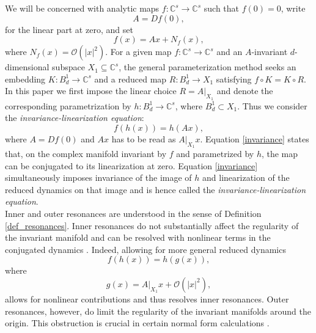 \documentclass{amsart}
\theoremstyle{plain}
\theoremstyle{definition}
\begin{document}
We will be concerned with analytic maps $f:\mathbb{C}^s\to\mathbb{C}^s$ such that $f(0)=0$, write
\begin{equation}\label{defA}
A=Df(0),
\end{equation}
for the linear part at zero, and set
\begin{equation}
f(x)=Ax+N_f(x),
\end{equation}
where $N_f(x)=\mathcal{O}(|x|^2)$. For a given map $f:\mathbb{C}^s\to\mathbb{C}^s$ and an $A$-invariant $d$-dimensional subspace $X_1\subseteq\mathbb{C}^s$, the general parameterization method seeks an embedding $K:B^1_d\to\mathbb{C}^s$ and a reduced map $R:B^1_d\to X_1$ satisfying $f\circ K=K\circ R$. In this paper we first impose the linear choice $R=A|_{X_1}$ and denote the corresponding parametrization by $h:B^1_d\to\mathbb{C}^s$, where $B^1_d\subset X_1$. Thus we consider the \emph{invariance-linearization equation}:
\begin{equation}\label{invariance}
f(h(x))=h(Ax),
\end{equation}
where $A=Df(0)$ and $Ax$ has to be read as $A|_{X_1}x$. Equation \eqref{invariance} states that, on the complex manifold invariant by $f$ and parametrized by $h$, the map can be conjugated to its linearization at zero. Equation \eqref{invariance} simultaneously imposes invariance of the image of $h$ and linearization of the reduced dynamics on that image and is hence called the \emph{invariance-linearization equation}.\\
Inner and outer resonances are understood in the sense of Definition \ref{def_resonances}. Inner resonances do not substantially affect the regularity of the invariant manifold and can be resolved with nonlinear terms in the conjugated dynamics \cite{CABRE2005444}. Indeed, allowing for more general reduced dynamics 
\begin{equation}
    f(h(x)) = h(g(x)),
\end{equation}
where 
\begin{equation}\label{nonlinearreduced}
    g(x) = A|_{X_1}x + \mathcal{O}(|x|^2),
\end{equation}
allows for nonlinear contributions and thus resolves inner resonances. Outer resonances, however, do limit the regularity of the invariant manifolds around the origin. This obstruction is crucial in certain normal form calculations \cite{Neild20140404}.\\
\end{document}
